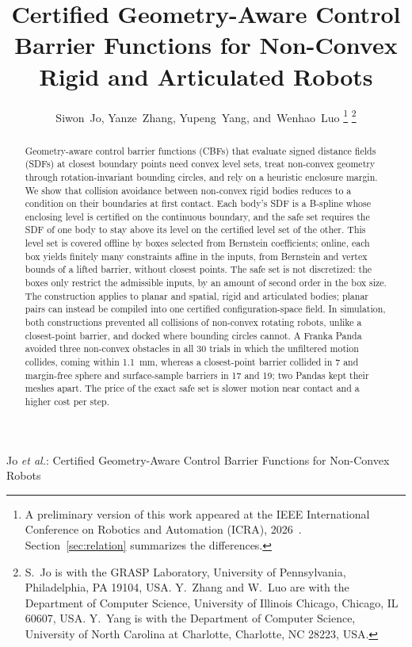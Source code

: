 \documentclass[journal]{IEEEtran}
\theoremstyle{definition}
\newif\ifanonymous
\begin{document}
\title{Certified Geometry-Aware Control Barrier Functions for Non-Convex Rigid and Articulated
Robots}

\ifanonymous
\author{Anonymous Authors}
\markboth{IEEE Transactions on Robotics}%
{Certified Geometry-Aware Control Barrier Functions for Non-Convex Robots}
\else
\author{Siwon~Jo, Yanze~Zhang, Yupeng~Yang, and~Wenhao~Luo%
\thanks{A preliminary version of this work appeared at the IEEE International Conference on
Robotics and Automation (ICRA), 2026~\cite{jo2026geometry}. Section~\ref{sec:relation}
summarizes the differences.}%
\thanks{S.~Jo is with the GRASP Laboratory, University of Pennsylvania, Philadelphia, PA 19104,
USA. Y.~Zhang and W.~Luo are with the Department of Computer Science, University of Illinois
Chicago, Chicago, IL 60607, USA. Y.~Yang is with the Department of Computer Science, University
of North Carolina at Charlotte, Charlotte, NC 28223, USA.}}

%
{Jo \MakeLowercase{\textit{et al.}}: Certified Geometry-Aware Control Barrier Functions for Non-Convex Robots}
\fi

\maketitle

\begin{abstract}
Geometry-aware control barrier functions (CBFs) that evaluate signed distance fields (SDFs) at
closest boundary points need convex level sets, treat non-convex geometry through rotation-invariant
bounding circles, and rely on a heuristic enclosure margin. We show that collision avoidance between
non-convex rigid bodies reduces to a condition on their boundaries at first contact. Each body's SDF
is a B-spline whose enclosing level is certified on the continuous boundary, and the safe set
requires the SDF of one body to stay above its level on the certified level set of the other. This
level set is covered offline by boxes selected from Bernstein coefficients; online, each box yields
finitely many constraints affine in the inputs, from Bernstein and vertex bounds of a lifted barrier,
without closest points. The safe set is not discretized: the boxes only restrict the admissible
inputs, by an amount of second order in the box size. The construction applies to planar and
spatial, rigid and articulated bodies; planar pairs can instead be compiled into one certified
configuration-space field. In simulation, both constructions prevented all collisions of non-convex
rotating robots, unlike a closest-point barrier, and docked where bounding circles cannot. A Franka
Panda avoided three non-convex obstacles in all 30 trials in which the unfiltered motion collides,
coming within 1.1~mm, whereas a closest-point barrier collided in 7 and margin-free sphere and
surface-sample barriers in 17 and 19; two Pandas kept their meshes apart. The price of the exact
safe set is slower motion near contact and a higher cost per step.
\end{abstract}
\end{document}
